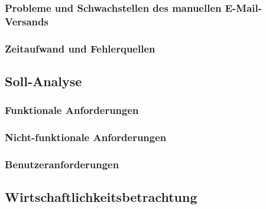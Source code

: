 \documentclass[11pt,a4paper]{article}
\begin{document}
\subsubsection{Probleme und Schwachstellen des manuellen E-Mail-Versands}

\subsubsection{Zeitaufwand und Fehlerquellen}

\subsection{Soll-Analyse}

\subsubsection{Funktionale Anforderungen}

\subsubsection{Nicht-funktionale Anforderungen}

\subsubsection{Benutzeranforderungen}

\subsection{Wirtschaftlichkeitsbetrachtung}
\end{document}
